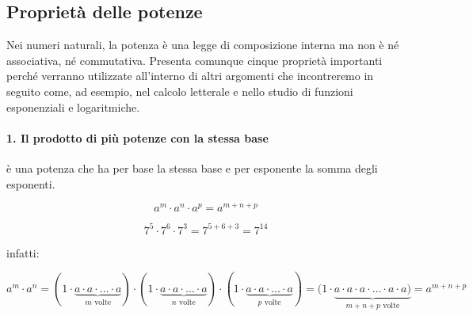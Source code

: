 
\newcommand{\triaffiancati}[6]{
  \noindent
  \begin{minipage}[b]{#1\textwidth}
  #4
  \end{minipage}
  \hfill
  \begin{minipage}[b]{#2\textwidth}
  #5
  \end{minipage}
  \hfill
  \begin{minipage}[b]{#3\textwidth}
  #6
  \end{minipage}
}

\subsection{Proprietà delle potenze}

Nei numeri naturali, la potenza è una legge di composizione interna ma non è 
né associativa, né commutativa.
Presenta comunque cinque proprietà importanti perché verranno utilizzate 
all'interno di altri argomenti che incontreremo in seguito come, ad esempio, 
nel calcolo letterale e nello studio di funzioni esponenziali e logaritmiche.

\paragraph{1. Il prodotto di più potenze con la stessa base} 
è una potenza che ha per base la stessa base e per esponente la somma 
degli esponenti.

\triaffiancati{.40}{.40}{.15}{
\[\boxed{a^m \cdot a^n \cdot a^p = a^{m+n+p}}\]
}{
\[7^5 \cdot 7^6 \cdot 7^3 = 7^{5 + 6 + 3} = 7^{14}\]
}{
infatti:
}
\[a^m \cdot a^n = 
  (1 \cdot \underbrace{a \cdot a \cdot \ldots \cdot a}_{m \text{ volte}}) 
\cdot 
  (1 \cdot \underbrace{a \cdot a \cdot \ldots \cdot a}_{n \text{ volte}}) 
\cdot 
  (1 \cdot \underbrace{a \cdot a \cdot \ldots \cdot a}_{p \text{ volte}}) =
  (1 \cdot \underbrace{a \cdot a \cdot a \cdot \ldots \cdot a 
  \cdot a)}_{m+n+p\text{ volte}} = a^{m+n+p}\]

\vspace{-1.5em}
